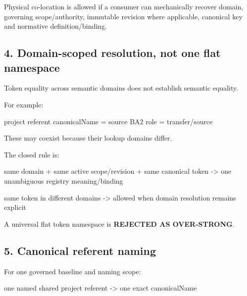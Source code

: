 \documentclass[
  10pt,
  a4paper,
]{article}
\newenvironment{Shaded}{}{}
\newcommand{\NormalTok}[1]{#1}
\begin{document}
Physical co-location is allowed if a consumer can mechanically recover
domain, governing scope/authority, immutable revision where applicable,
canonical key and normative definition/binding.

\subsection{4. Domain-scoped resolution, not one flat
namespace}\label{4-domain-scoped-resolution-not-one-flat-namespace}

Token equality across semantic domains does not establish semantic
equality.

For example:

\begin{Shaded}
\begin{Highlighting}[]
\NormalTok{project referent canonicalName = source}
\NormalTok{BA2 role                        = transfer/source}
\end{Highlighting}
\end{Shaded}

These may coexist because their lookup domains differ.

The closed rule is:

\begin{Shaded}
\begin{Highlighting}[]
\NormalTok{same domain + same active scope/revision + same canonical token}
\NormalTok{    {-}\textgreater{} one unambiguous registry meaning/binding}

\NormalTok{same token in different domains}
\NormalTok{    {-}\textgreater{} allowed when domain resolution remains explicit}
\end{Highlighting}
\end{Shaded}

A universal flat token namespace is \textbf{REJECTED AS OVER-STRONG}.

\subsection{5. Canonical referent
naming}\label{5-canonical-referent-naming}

For one governed baseline and naming scope:

\begin{Shaded}
\begin{Highlighting}[]
\NormalTok{one named shared project referent}
\NormalTok{    {-}\textgreater{} one exact canonicalName}
\end{Highlighting}
\end{Shaded}
\end{document}
